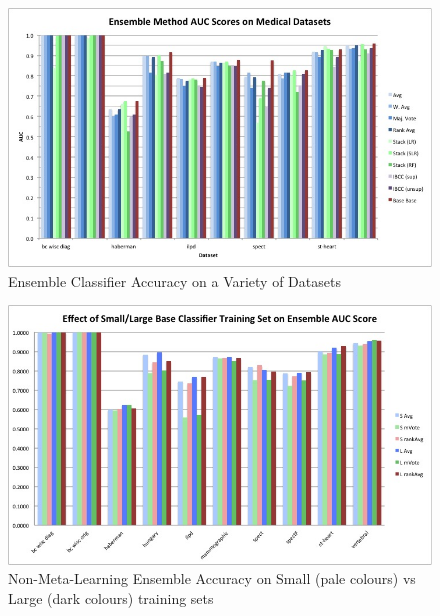 \documentclass{bioinfo}
\begin{document}
\clearpage

\begin{figure}[p]
\centering
\includegraphics[angle=270]{ensemblegraph.jpg}
\caption{Ensemble Classifier Accuracy on a Variety of Datasets}
\label{fig:02}
\end{figure}

\clearpage

\begin{figure}[p]
\includegraphics[angle=270]{smallvlargegraph.jpg}
\caption{Non-Meta-Learning Ensemble Accuracy on Small (pale colours) vs Large (dark colours) training sets}
\label{fig:03}
\end{figure}

\clearpage
\end{document}
